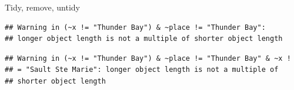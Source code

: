 \documentclass[ignorenonframetext,]{beamer}
\newenvironment{Shaded}{\begin{snugshade}}{\end{snugshade}}
\newcommand{\DecValTok}[1]{\textcolor[rgb]{0.00,0.00,0.81}{#1}}
\newcommand{\KeywordTok}[1]{\textcolor[rgb]{0.13,0.29,0.53}{\textbf{#1}}}
\newcommand{\NormalTok}[1]{#1}
\newcommand{\OperatorTok}[1]{\textcolor[rgb]{0.81,0.36,0.00}{\textbf{#1}}}
\newcommand{\StringTok}[1]{\textcolor[rgb]{0.31,0.60,0.02}{#1}}
\begin{document}
\begin{frame}[fragile]{Tidy, remove, untidy}
\protect\hypertarget{tidy-remove-untidy}{}

\begin{Shaded}
\end{Shaded}

\begin{verbatim}
## Warning in (~x != "Thunder Bay") & ~place != "Thunder Bay":
## longer object length is not a multiple of shorter object length
\end{verbatim}

\begin{verbatim}
## Warning in (~x != "Thunder Bay") & ~place != "Thunder Bay" & ~x !
## = "Sault Ste Marie": longer object length is not a multiple of
## shorter object length
\end{verbatim}


\end{frame}
\end{document}
